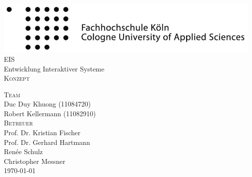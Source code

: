 
\begin{titlepage}

\begin{center}

\includegraphics[width=1.0\textwidth]{fhkoeln.jpg}
\\[2cm]
\textsc{\LARGE EIS}
\\[0.2cm]
{\Large Entwicklung Interaktiver Systeme}
\\[3cm]
\textsc{\Huge Konzept}

\vfill

\textsc{\Large Team}\\
Duc Duy Khuong (11084720)\\
Robert Kellermann (11082910)
\\[1cm]
\textsc{\Large Betreuer}\\
Prof. Dr. Kristian Fischer\\
Prof. Dr. Gerhard Hartmann\\
Renée Schulz\\
Christopher Messner
\\[2cm]
\today

\end{center}

\end{titlepage}